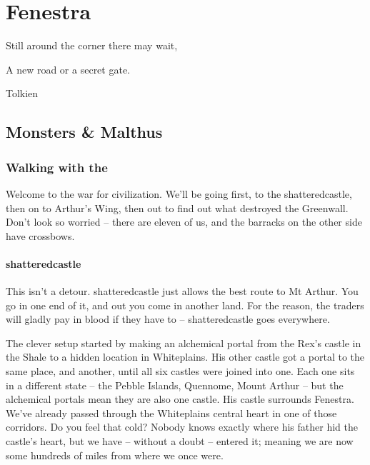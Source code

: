 \chapter{Fenestra}

\epigraph{Still around the corner there may wait,

A new road or a secret gate.}{Tolkien}

\section{Monsters \& Malthus}

\begin{multicols}{2}

\subsection{Walking with the }

\begin{exampletext}

	Welcome to the war for civilization.
	We'll be going first, to the \gls{shatteredcastle}, then on to Arthur's Wing, then out to find out what destroyed the Greenwall.
	Don't look so worried -- there are eleven of us, and the barracks on the other side have crossbows.

\end{exampletext}

\subsubsection{\Gls{shatteredcastle}}

\begin{exampletext}

	This isn't a detour.
	\Gls{shatteredcastle} just allows the best route to Mt Arthur.
	You go in one end of it, and out you come in another land.
	For the reason, the traders will gladly pay in blood if they have to -- \gls{shatteredcastle} goes everywhere.

	The clever setup started by making an alchemical portal from the Rex's castle in the Shale to a hidden location in Whiteplains.
	His other castle got a portal to the same place, and another, until all six castles were joined into one.
	Each one sits in a different state -- the Pebble Islands, Quennome, Mount Arthur -- but the alchemical portals mean they are also one castle.
	His castle surrounds Fenestra.
	We've already passed through the Whiteplains central heart in one of those corridors.
	Do you feel that cold?
	Nobody knows exactly where his father hid the castle's heart, but we have -- without a doubt -- entered it; meaning we are now some hundreds of miles from where we once were.


\end{exampletext}
\end{multicols}
